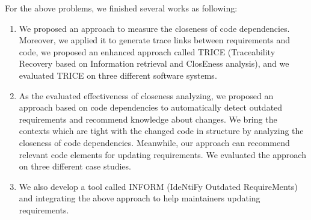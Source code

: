 \documentclass[twoside, master]{NJUthesis}
\theoremstyle{plain}
\begin{document}
\begin{englishabstract}
For the above problems, we finished several works as following:
\begin{enumerate}
  \item We proposed an approach to measure the closeness of code dependencies. Moreover, we applied it to generate trace links between requirements and code, we proposed an enhanced approach called TRICE (Traceability Recovery based on Information retrieval and ClosEness analysis), and we evaluated TRICE on three different software systems.
  \item As the evaluated effectiveness of closeness analyzing, we proposed an approach based on code dependencies to automatically detect outdated requirements and recommend knowledge about changes. We bring the contexts which are tight with the changed code in structure by analyzing the closeness of code dependencies. Meanwhile, our approach can recommend relevant code elements for updating requirements. We evaluated the approach on three different case studies.
  \item We also develop a tool called INFORM (IdeNtiFy Outdated RequireMents) and integrating the above approach to help maintainers updating requirements.
\end{enumerate}

\end{englishabstract}

\tableofcontents

\listoffigures

%



\mainmatter














\backmatter
\end{document}
